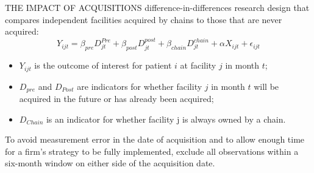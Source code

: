 \begin{frame}{THE IMPACT OF ACQUISITIONS }
    difference-in-differences research design that compares independent facilities acquired by chains to those that are never acquired:
    $$Y_{ijt} = \beta_{pre}D^{Pre}_{jt} + \beta_{post}D^{post}_{jt} + \beta_{chain}D^{chain}_{jt} + \alpha X_{ijt} + \epsilon_{ijt} $$

\begin{itemize}
    \item $Y_{ijt}$ is the outcome of interest for patient $i$ at facility $j$ in month $t$;
    \item $D_{pre}$ and $D_{Post}$ are indicators for whether facility $j$ in
month $t$ will be acquired in the future or has already been acquired;
    \item $D_{Chain}$ is an indicator for whether facility j is always owned by a chain.
\end{itemize}

To avoid measurement error in the date of acquisition and to allow enough time for a firm’s strategy to be fully implemented, exclude all observations within a six-month window on either side of the acquisition date.

\end{frame}